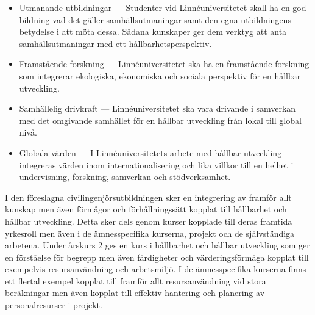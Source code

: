 \begin{itemize}
\item
  Utmanande utbildningar --- Studenter vid Linnéuniversitetet skall ha en god bildning vad det gäller samhällsutmaningar samt den egna utbildningens betydelse i att möta dessa. Sådana kunskaper ger dem verktyg att anta samhällsutmaningar med ett hållbarhetsperspektiv.
\item
  Framstående forskning --- Linnéuniversitetet ska ha en framstående forskning som integrerar ekologiska, ekonomiska och sociala perspektiv för en hållbar utveckling.
\item
  Samhällelig drivkraft --- Linnéuniversitetet ska vara drivande i samverkan med det omgivande samhället för en hållbar utveckling från lokal till global nivå.
\item
  Globala värden --- I Linnéuniversitetets arbete med hållbar utveckling integreras värden inom internationalisering och lika villkor till en helhet i undervisning, forskning, samverkan och stödverksamhet.
\end{itemize}

I den föreslagna civilingenjörsutbildningen sker en integrering av framför allt kunskap men även förmågor och förhållningssätt kopplat till hållbarhet och hållbar utveckling. Detta sker dels genom kurser kopplade till deras framtida yrkesroll men även i de ämnesspecifika kurserna, projekt och de självständiga arbetena. Under årskurs 2 ges en kurs i hållbarhet och hållbar utveckling som ger en förståelse för begrepp men även färdigheter och värderingsförmåga kopplat till exempelvis resursanvändning och arbetsmiljö. I de ämnesspecifika kurserna finns ett flertal exempel kopplat till framför allt resursanvändning vid stora beräkningar men även kopplat till effektiv hantering och planering av personalresurser i projekt.
